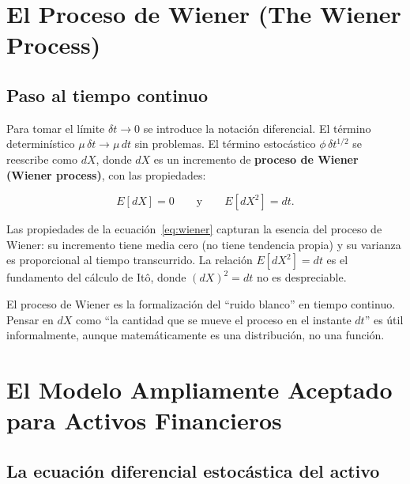 \documentclass[12pt]{article}
\begin{document}
\section{El Proceso de Wiener (The Wiener Process)}

\subsection{Paso al tiempo continuo}

Para tomar el l\'imite $\delta t \to 0$ se introduce la notaci\'on diferencial.
El t\'ermino determin\'istico $\mu\,\delta t \to \mu\,dt$ sin problemas.
El t\'ermino estoc\'astico $\phi\,\delta t^{1/2}$ se reescribe como $dX$,
donde $dX$ es un incremento de \textbf{proceso de Wiener (Wiener process)},
con las propiedades:

\begin{equation}
  E[dX] = 0 \qquad\text{y}\qquad E[dX^2] = dt.
  \label{eq:wiener}
\end{equation}

\begin{intuicionmat}
Las propiedades de la ecuaci\'on~\eqref{eq:wiener} capturan la esencia del proceso
de Wiener: su incremento tiene media cero (no tiene tendencia propia) y su varianza
es proporcional al tiempo transcurrido. La relaci\'on $E[dX^2] = dt$ es el
fundamento del c\'alculo de It\^o, donde $(dX)^2 = dt$ no es despreciable.
\end{intuicionmat}

\begin{intuicion}
El proceso de Wiener es la formalizaci\'on del ``ruido blanco'' en tiempo continuo.
Pensar en $dX$ como ``la cantidad que se mueve el proceso en el instante $dt$''
es \'util informalmente, aunque matem\'aticamente es una distribuci\'on, no una
funci\'on.
\end{intuicion}

\section{El Modelo Ampliamente Aceptado para Activos Financieros}

\subsection{La ecuaci\'on diferencial estoc\'astica del activo}
\end{document}
